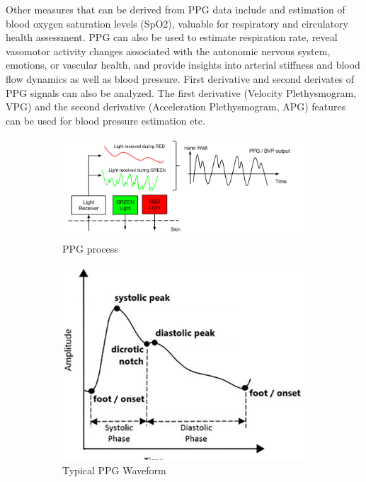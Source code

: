 Other measures that can be derived from PPG data include  and estimation of blood oxygen saturation levels (SpO2), valuable for respiratory and circulatory health assessment. PPG can also be used to estimate respiration rate, reveal vasomotor activity changes associated with the autonomic nervous system, emotions, or vascular health, and provide insights into arterial stiffness and blood flow dynamics as well as blood pressure. First derivative and second derivates of PPG signals can also be analyzed. The first derivative (Velocity Plethysmogram, VPG) and the second derivative (Acceleration Plethysmogram, APG) features can be used for  blood pressure estimation etc.\parencite{apg}


\begin{figure}[h]
    \centering
    \begin{subfigure}[b]{0.55\columnwidth}
        \includegraphics[width=\textwidth]{images/PPG.png}
        \caption{PPG process}
        \label{fig:ppg}
    \end{subfigure}
    \begin{subfigure}[b]{0.35\columnwidth}
        \includegraphics[width=\textwidth]{images/ppg2.png}
        \caption{Typical PPG Waveform}
        \label{fig:phone2}
    \end{subfigure}
    \caption{\parencite{emp} \parencite{apg}}
    \label{fig:phone}
\end{figure}



